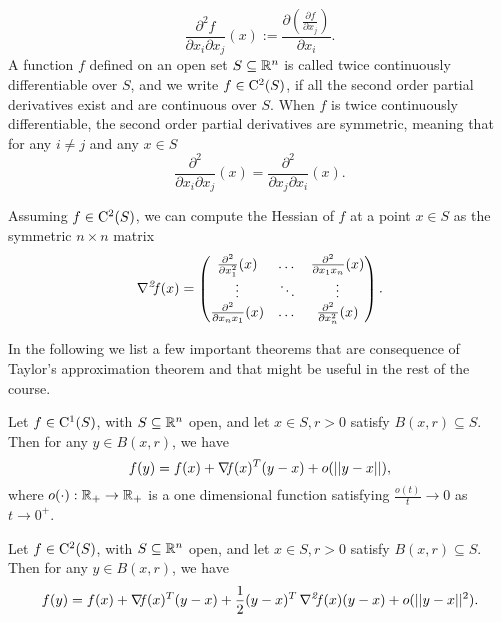 \documentclass[10pt,a4paper]{article}
\begin{document}
\begin{equation*}
	\frac{\partial^2 f}{\partial x_i \partial x_j}(x) := \frac{\partial \left(\frac{\partial f}{\partial x_j}\right)}{\partial x_i}.
\end{equation*}
A function $f$ defined on an open set $S \subseteq \mathbb{R}^n$ is called twice continuously differentiable over $S$, and we write $f\in \mathord{\mathrm{C^2}}(S)$, if all the second order partial derivatives exist and are continuous over $S$. When $f$ is twice continuously differentiable, the second order partial derivatives are symmetric, meaning that for any $i\neq j$ and any $x\in S$
\begin{equation*}
	\frac{\partial^2}{\partial x_i \partial x_j} (x) = \frac{\partial^2}{\partial x_j \partial x_i} (x).
\end{equation*}
\begin{definition}[Hessian]
	Assuming $f\in \mathord{\mathrm{C^2}}(S)$, we can compute the Hessian of $f$ at a point $x\in S$ as the symmetric $n\times n$ matrix
	\begin{equation*}
		\operatorname*{\mathit{\nabla^2 \!f}} (x) = \begin{pmatrix}
			\frac{\partial^2}{\partial x_1^2 } (x) & \dots & \frac{\partial^2}{\partial x_1 x_n } (x)\\
			\vdots & \ddots & \vdots\\
			\frac{\partial^2}{\partial x_n x_1 } (x) & \dots & \frac{\partial^2}{\partial x_n^2 } (x)
		\end{pmatrix}
	.
	\end{equation*}
\end{definition}
\noindent In the following we list a few important theorems that are consequence of Taylor's approximation theorem and that might be useful in the rest of the course. 
\begin{theorem}\label{thm:linear_approx}
	Let $f\in \mathord{\mathrm{C^1}}(S)$, with $S\subseteq \mathbb{R}^n$ open, and let $x\in S, r>0$ satisfy $B(x,r)\subseteq S$. Then for any $y\in B(x,r)$, we have 
	\begin{equation*}
		f(y) = f(x)+ \operatorname*{\mathit{\nabla \!f}} (x)^T(y-x) + o(||y-x||),
	\end{equation*}
where $o(\cdot):\mathbb{R}_+\to \mathbb{R}_+$ is a one dimensional function satisfying $\frac{o(t)}{t} \to 0$ as $t\to0^+$.
\end{theorem}
\begin{theorem}
Let $f\in \mathord{\mathrm{C^2}}(S)$, with $S\subseteq \mathbb{R}^n$ open, and let $x\in S, r>0$ satisfy $B(x,r)\subseteq S$. Then for any $y\in B(x,r)$, we have 
\begin{equation*}
	f(y) = f(x)+ \operatorname*{\mathit{\nabla \!f}} (x)^T(y-x) +\frac{1}{2}(y-x)^T\operatorname*{\mathit{\nabla^2 \!f}}(x)(y-x) +  o(||y-x||^2).
\end{equation*}
\end{theorem}
\end{document}
